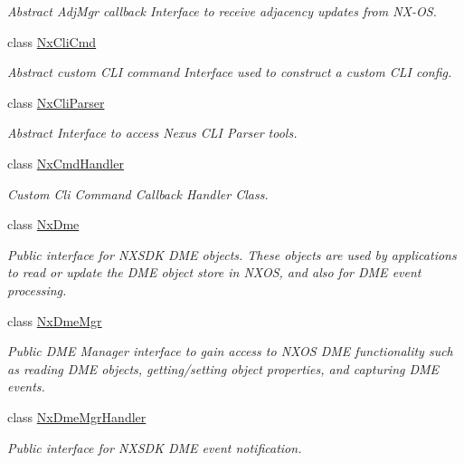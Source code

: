 \begin{DoxyCompactItemize}
\begin{DoxyCompactList}\small\item\em Abstract Adj\+Mgr callback Interface to receive adjacency updates from N\+X-\/\+OS. \end{DoxyCompactList}\item 
class \mbox{\hyperlink{classnxos_1_1_nx_cli_cmd}{Nx\+Cli\+Cmd}}
\begin{DoxyCompactList}\small\item\em Abstract custom C\+LI command Interface used to construct a custom C\+LI config. \end{DoxyCompactList}\item 
class \mbox{\hyperlink{classnxos_1_1_nx_cli_parser}{Nx\+Cli\+Parser}}
\begin{DoxyCompactList}\small\item\em Abstract Interface to access Nexus C\+LI Parser tools. \end{DoxyCompactList}\item 
class \mbox{\hyperlink{classnxos_1_1_nx_cmd_handler}{Nx\+Cmd\+Handler}}
\begin{DoxyCompactList}\small\item\em Custom Cli Command Callback Handler Class. \end{DoxyCompactList}\item 
class \mbox{\hyperlink{classnxos_1_1_nx_dme}{Nx\+Dme}}
\begin{DoxyCompactList}\small\item\em Public interface for N\+X\+S\+DK D\+ME objects. These objects are used by applications to read or update the D\+ME object store in N\+X\+OS, and also for D\+ME event processing. \end{DoxyCompactList}\item 
class \mbox{\hyperlink{classnxos_1_1_nx_dme_mgr}{Nx\+Dme\+Mgr}}
\begin{DoxyCompactList}\small\item\em Public D\+ME Manager interface to gain access to N\+X\+OS D\+ME functionality such as reading D\+ME objects, getting/setting object properties, and capturing D\+ME events. \end{DoxyCompactList}\item 
class \mbox{\hyperlink{classnxos_1_1_nx_dme_mgr_handler}{Nx\+Dme\+Mgr\+Handler}}
\begin{DoxyCompactList}\small\item\em Public interface for N\+X\+S\+DK D\+ME event notification. \end{DoxyCompactList}\item 

\end{DoxyCompactItemize}
